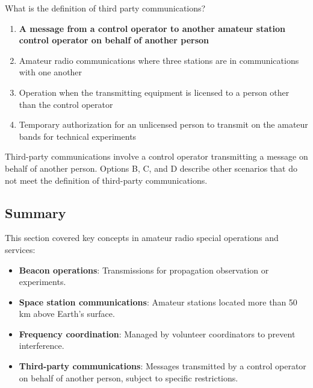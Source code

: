 \begin{tcolorbox}[colback=gray!10!white,colframe=black!75!black,title={T1F08}]
    What is the definition of third party communications?
    \begin{enumerate}[label=\Alph*),noitemsep]
        \item \textbf{A message from a control operator to another amateur station control operator on behalf of another person}
        \item Amateur radio communications where three stations are in communications with one another
        \item Operation when the transmitting equipment is licensed to a person other than the control operator
        \item Temporary authorization for an unlicensed person to transmit on the amateur bands for technical experiments
    \end{enumerate}
\end{tcolorbox}
Third-party communications involve a control operator transmitting a message on behalf of another person. Options B, C, and D describe other scenarios that do not meet the definition of third-party communications.


\subsection*{Summary}
This section covered key concepts in amateur radio special operations and services:
\begin{itemize}
    \item \textbf{Beacon operations}: Transmissions for propagation observation or experiments.
    \item \textbf{Space station communications}: Amateur stations located more than 50 km above Earth's surface.
    \item \textbf{Frequency coordination}: Managed by volunteer coordinators to prevent interference.
    \item \textbf{Third-party communications}: Messages transmitted by a control operator on behalf of another person, subject to specific restrictions.
\end{itemize}
